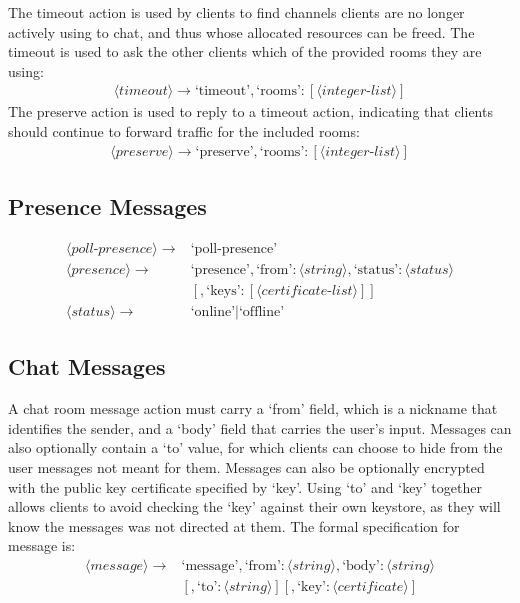 \documentclass{article}
\begin{document}
The timeout action is used by clients to find channels clients are no longer
actively using to chat, and thus whose allocated resources can be freed. The
timeout is used to ask the other clients which of the provided rooms they are
using: 
\begin{align*}
\langle timeout\rangle  \rightarrow \text{`timeout'}, \text{`rooms'} : [\langle
integer\text{-}list\rangle ]
\end{align*}
The preserve action is used to reply to a timeout action, indicating that
clients should continue to forward traffic for the included rooms:
\begin{align*}
\langle preserve\rangle  \rightarrow \text{`preserve'}, \text{`rooms'} :
[\langle integer\text{-}list\rangle ]
\end{align*}
\subsection{Presence Messages}

\begin{align*}
\langle poll\text{-}presence\rangle  \rightarrow& \text{`poll-presence'} \\
\langle presence\rangle  \rightarrow& \text{`presence'} , \text{`from'} :
\langle string\rangle, \text{`status'} : \langle status\rangle \\
& [ , \text{`keys'} : [\langle certificate\text{-}list\rangle ] ] \\
\langle status\rangle  \rightarrow& \text{`online'} | \text{`offline'}
\end{align*}
\subsection{Chat Messages}

A chat room message action must carry a `from' field, which is a nickname that
identifies the sender, and a `body' field that carries the user's input.
Messages can also optionally contain a `to' value, for which clients can choose
to hide from the user messages not meant for them. Messages can also be
optionally encrypted with the public key certificate specified by `key'. Using
`to' and `key' together allows clients to avoid checking the `key' against their
own keystore, as they will know the messages was not directed at them. The
formal specification for message is:
\begin{align*}
\langle message\rangle  \rightarrow& \text{`message'} , \text{`from'} : \langle
string\rangle  , \text{`body'} : \langle string\rangle \\
&[ , \text{`to'} :
\langle string\rangle  ] [ , \text{`key'}: \langle certificate\rangle  ]
\end{align*}
\end{document}
